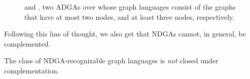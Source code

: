 \documentclass[a4paper,11pt,twoside]{report} \pdfoutput=1
\begin{document}
\begin{figure}[h!]
  \alignpic
  \begin{subfigure}{0.5\textwidth}
    \centering
         \caption{}
    \label{fig:ADGA_max_two}
  \end{subfigure}
  \begin{subfigure}{0.45\textwidth}
    \centering
         \caption{}
    \label{fig:ADGA_min_three}
  \end{subfigure}
  \caption{ and \!, two ADGAs over
     whose graph
    languages consist of the graphs that have at most two nodes, and
    at least three nodes, respectively.}
  \label{fig:ADGA_max_and_min}
\end{figure}

Following this line of thought, we also get that NDGAs cannot, in
general, be complemented.

\begin{lemma}[Complementation] \label{lem:ndga-complementation}
  The class  of NDGA-recognizable graph languages is
  \emph{not} closed under complementation.
\end{lemma}
\end{document}
